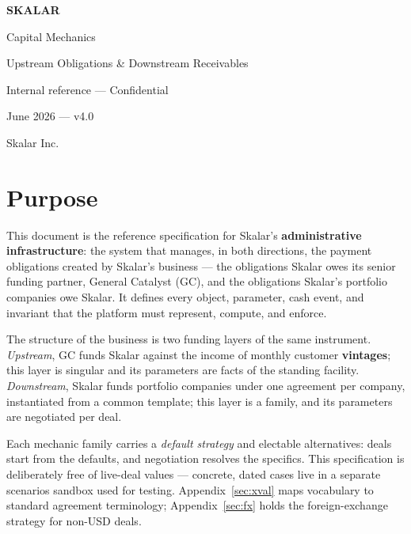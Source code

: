 \documentclass[11pt, a4paper]{article}
\theoremstyle{definition}
\begin{document}
\begin{titlepage}
    \centering
    \vspace*{3cm}
    {\Huge\bfseries SKALAR\par}
    \vspace{0.5cm}
    {\LARGE Capital Mechanics\par}
    \vspace{0.3cm}
    {\LARGE Upstream Obligations \& Downstream Receivables\par}
    \vspace{2cm}
    {\large Internal reference --- Confidential\par}
    \vspace{0.5cm}
    {\large June 2026 --- v4.0\par}
    \vfill
    {\small Skalar Inc.\par}
\end{titlepage}

\tableofcontents
\newpage

\section{Purpose}\label{sec:guide}

This document is the reference specification for Skalar's \textbf{administrative infrastructure}: the system that manages, in both directions, the payment obligations created by Skalar's business --- the obligations Skalar owes its senior funding partner, General Catalyst (GC), and the obligations Skalar's portfolio companies owe Skalar. It defines every object, parameter, cash event, and invariant that the platform must represent, compute, and enforce.

The structure of the business is two funding layers of the same instrument. \emph{Upstream}, GC funds Skalar against the income of monthly customer \textbf{vintages}; this layer is singular and its parameters are facts of the standing facility. \emph{Downstream}, Skalar funds portfolio companies under one agreement per company, instantiated from a common template; this layer is a family, and its parameters are negotiated per deal.

Each mechanic family carries a \emph{default strategy} and electable alternatives: deals start from the defaults, and negotiation resolves the specifics. This specification is deliberately free of live-deal values --- concrete, dated cases live in a separate scenarios sandbox used for testing. Appendix~\ref{sec:xval} maps vocabulary to standard agreement terminology; Appendix~\ref{sec:fx} holds the foreign-exchange strategy for non-USD deals.
\end{document}
